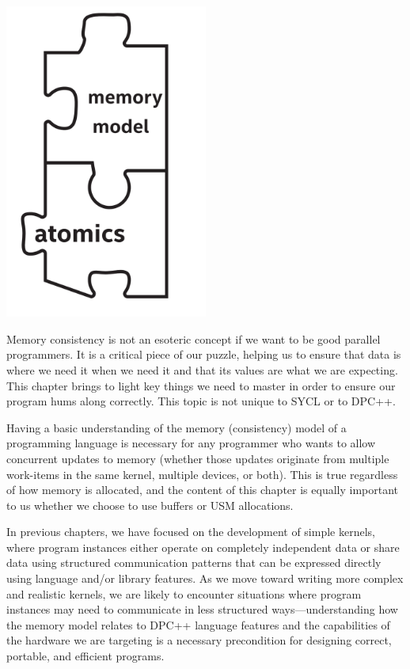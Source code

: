 \begin{center}
	\includegraphics[width=0.5\textwidth]{content/chapter-19/images/1}
\end{center}

Memory consistency is not an esoteric concept if we want to be good parallel programmers. It is a critical piece of our puzzle, helping us to ensure that data is where we need it when we need it and that its values are what we are expecting. This chapter brings to light key things we need to master in order to ensure our program hums along correctly. This topic is not unique to SYCL or to DPC++.\par

Having a basic understanding of the memory (consistency) model of a programming language is necessary for any programmer who wants to allow concurrent updates to memory (whether those updates originate from multiple work-items in the same kernel, multiple devices, or both). This is true regardless of how memory is allocated, and the content of this chapter is equally important to us whether we choose to use buffers or USM allocations.\par

In previous chapters, we have focused on the development of simple kernels, where program instances either operate on completely independent data or share data using structured communication patterns that can be expressed directly using language and/or library features. As we move toward writing more complex and realistic kernels, we are likely to encounter situations where program instances may need to communicate in less structured ways—understanding how the memory model relates to DPC++ language features and the capabilities of the hardware we are targeting is a necessary precondition for designing correct, portable, and efficient programs.\par


